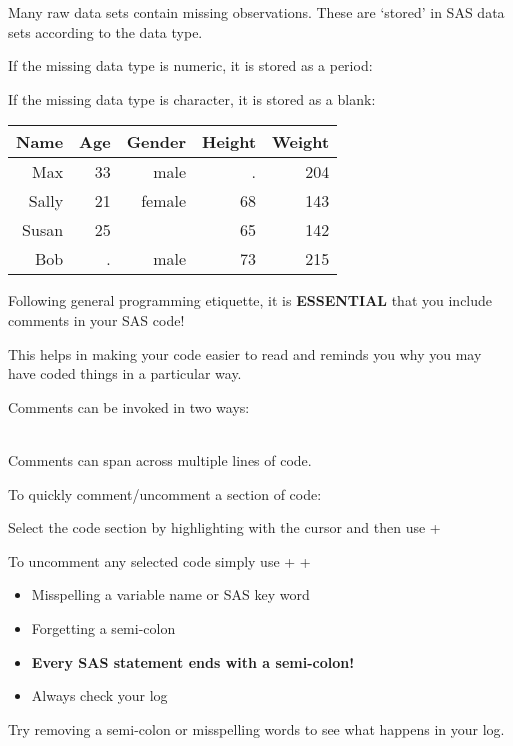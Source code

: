 \begin{frame}
Many raw data sets contain missing observations. These are `stored' in SAS data sets according to the data type.
\bi
\item \small{If the missing data type is numeric, it is stored as a period: }
\item \small{If the missing data type is character, it is stored as a blank: \ttb{\{\ \}}}
\ei
\vskip10pt
\begin{tabular}{rrrrr}
    \hline
    Name & Age & Gender & Height & Weight \\
    \hline\hline
    Max   & 33 & male   & .  & 204 \\
    Sally & 21 & female & 68 & 143 \\
    Susan & 25 &        & 65 & 142 \\
    Bob   & .  & male   & 73 & 215 \\
    \hline
\end{tabular}
\end{frame}

\begin{frame}
\bi
\item Following general programming etiquette, it is \textbf{ESSENTIAL} that you include comments in your SAS code!
\item This helps in making your code easier to read and reminds you why you may have coded things in a particular way.
\item Comments can be invoked in two ways:\\
    \qquad \qquad {}\\
    \qquad \qquad {}
\item Comments can span across multiple lines of code.
\item To quickly comment/uncomment a section of code:
	\bi
	\item Select the code section by highlighting with the cursor and then use  + \keys{/}\\
	\item To uncomment any selected code simply use  +  + \keys{/}\\
	\ei
\ei
\end{frame}

\begin{frame}
\begin{itemize}
     \item Misspelling a variable name or SAS key word
    \item Forgetting a semi-colon
    \item \textbf{Every SAS statement ends with a semi-colon!}
    \item Always check your log
\end{itemize}
\vskip10pt
\oyo
Try removing a semi-colon or misspelling words to see what happens in your log.
\end{frame}

